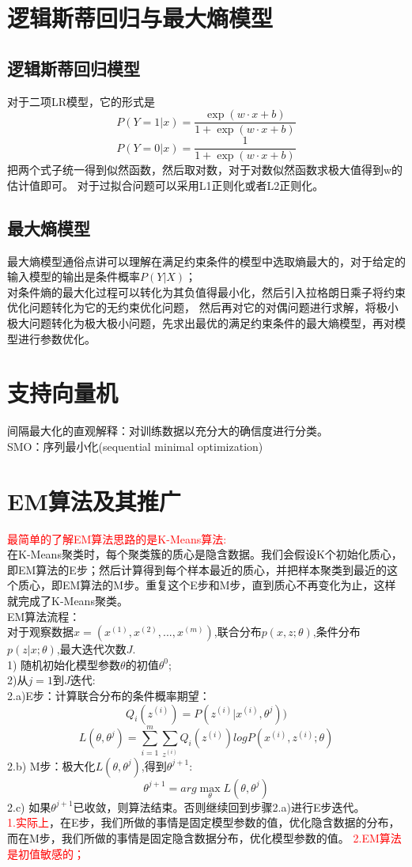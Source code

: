 \documentclass[UTF8]{article}%
\begin{document}
	
	\newpage
	\section{逻辑斯蒂回归与最大熵模型}
	\subsection{逻辑斯蒂回归模型}
	对于二项LR模型，它的形式是
	$$P(Y=1|x)=\frac{\exp(w \cdot x+b)}{1+\exp(w \cdot x+b)}$$
	$$P(Y=0|x)=\frac{1}{1+\exp(w \cdot x+b)}$$
	把两个式子统一得到似然函数，然后取对数，对于对数似然函数求极大值得到w的估计值即可。
	对于过拟合问题可以采用L1正则化或者L2正则化。
	\subsection{最大熵模型}
	最大熵模型通俗点讲可以理解在满足约束条件的模型中选取熵最大的，对于给定的输入模型的输出是条件概率$P(Y|X)$；\\
	对条件熵的最大化过程可以转化为其负值得最小化，然后引入拉格朗日乘子将约束优化问题转化为它的无约束优化问题，
	然后再对它的对偶问题进行求解，将极小极大问题转化为极大极小问题，先求出最优的满足约束条件的最大熵模型，再对模型进行参数优化。
	\newpage
	\section{支持向量机}
	间隔最大化的直观解释：对训练数据以充分大的确信度进行分类。\\
	SMO：序列最小化(sequential minimal optimization)
	
	\newpage    
	\section{EM算法及其推广}
	\textcolor{red}{最简单的了解EM算法思路的是K-Means算法:}
	\\在K-Means聚类时，每个聚类簇的质心是隐含数据。我们会假设K个初始化质心，即EM算法的E步；然后计算得到每个样本最近的质心，并把样本聚类到最近的这个质心，即EM算法的M步。重复这个E步和M步，直到质心不再变化为止，这样就完成了K-Means聚类。
	\\EM算法流程：
	\\对于观察数据$x=(x^{(1)},x^{(2)},...,x^{(m)})$,联合分布$p(x,z;\theta)$,条件分布$p(z|x;\theta)$,最大迭代次数$J$.
	\\1) 随机初始化模型参数$\theta$的初值$\theta^0$;
	\\2)从$j=1$到$J$迭代:
	\\2.a)E步：计算联合分布的条件概率期望：$$Q_i(z^{(i)}) = P( z^{(i)}|x^{(i)},\theta^{j}))$$
	$$L(\theta, \theta^{j}) = \sum\limits_{i=1}^m\sum\limits_{z^{(i)}}Q_i(z^{(i)})log{P(x^{(i)}, z^{(i)};\theta)}$$
	2.b) M步：极大化$L(\theta, \theta^{j})$,得到$ \theta^{j+1}$:
	$$\theta^{j+1} = arg \max \limits_{\theta}L(\theta, \theta^{j})$$
	2.c) 如果$ \theta^{j+1}$已收敛，则算法结束。否则继续回到步骤2.a)进行E步迭代。
	\\	\textcolor{red}{1.实际上}，在E步，我们所做的事情是固定模型参数的值，优化隐含数据的分布，而在M步，我们所做的事情是固定隐含数据分布，优化模型参数的值。
	\textcolor{red}{2.EM算法是初值敏感的；}
	
\end{document}
